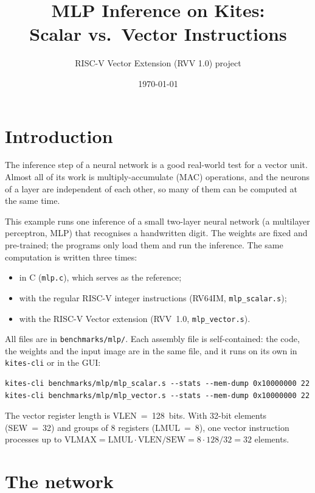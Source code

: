 \documentclass[11pt,a4paper]{article}
\title{MLP Inference on Kites:\\ Scalar vs.\ Vector Instructions}
\author{RISC-V Vector Extension (RVV 1.0) project}
\date{\today}
\newcommand{\code}[1]{\texttt{#1}}
\begin{document}
\maketitle

\section{Introduction}

The inference step of a neural network is a good real-world test for a vector unit. Almost all of
its work is multiply-accumulate (MAC) operations, and the neurons of a layer are independent of
each other, so many of them can be computed at the same time.

This example runs one inference of a small two-layer neural network (a multilayer perceptron,
MLP) that recognises a handwritten digit. The weights are fixed and pre-trained; the programs only
load them and run the inference. The same computation is written three times:
\begin{itemize}
  \item in C (\code{mlp.c}), which serves as the reference;
  \item with the regular RISC-V integer instructions (RV64IM, \code{mlp\_scalar.s});
  \item with the RISC-V Vector extension (RVV~1.0, \code{mlp\_vector.s}).
\end{itemize}
All files are in \code{benchmarks/mlp/}. Each assembly file is self-contained: the code, the
weights and the input image are in the same file, and it runs on its own in \code{kites-cli} or in
the GUI:
\begin{lstlisting}[style=asm]
kites-cli benchmarks/mlp/mlp_scalar.s --stats --mem-dump 0x10000000 22
kites-cli benchmarks/mlp/mlp_vector.s --stats --mem-dump 0x10000000 22
\end{lstlisting}

The vector register length is VLEN~=~128~bits. With 32-bit elements (SEW~=~32) and groups of 8
registers (LMUL~=~8), one vector instruction processes up to
$\mathrm{VLMAX} = \mathrm{LMUL}\cdot\mathrm{VLEN}/\mathrm{SEW} = 8\cdot128/32 = 32$ elements.

\section{The network}
\end{document}
